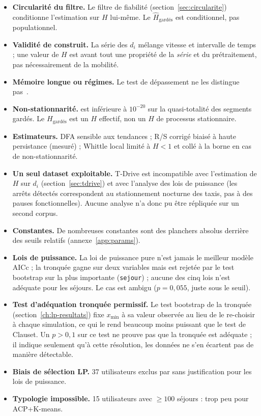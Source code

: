 \documentclass[12pt,a4paper]{report}
\theoremstyle{definition}
\DeclareRobustCommand{\code}[1]{\texorpdfstring{\texttt{\detokenize{#1}}}{\detokenize{#1}}}
\begin{document}
\begin{itemize}
  \item \textbf{Circularité du filtre.} Le filtre de fiabilité (section~\ref{sec:circularite})
  conditionne l'estimation sur $H$ lui-même. Le $\hat H_{\text{gardés}}$ est conditionnel,
  pas populationnel.
  \item \textbf{Validité de construit.} La série des $d_i$ mélange vitesse et intervalle de
  temps ; une valeur de $H$ est avant tout une propriété de la \emph{série} et du
  prétraitement, pas nécessairement de la mobilité.
  \item \textbf{Mémoire longue ou régimes.} Le test de dépassement ne les distingue
  pas~\cite{diebold2001}.
  \item \textbf{Non-stationnarité.} \code{statio_p_value} est inférieure à $10^{-20}$ sur
  la quasi-totalité des segments gardés. Le $H_{\text{gardés}}$ est un $H$ effectif, non
  un $H$ de processus stationnaire.
  \item \textbf{Estimateurs.} DFA sensible aux tendances ; R/S corrigé biaisé à haute
  persistance (mesuré) ; Whittle local limité à $H<1$ et collé à la borne en cas de
  non-stationnarité.
  \item \textbf{Un seul dataset exploitable.} T-Drive est incompatible avec l'estimation
  de $H$ sur $d_i$ (section~\ref{sec:tdrive}) et avec l'analyse des lois de puissance
  (les arrêts détectés correspondent au stationnement nocturne des taxis, pas à des
  pauses fonctionnelles). Aucune analyse n'a donc pu être répliquée sur un second corpus.
  \item \textbf{Constantes.} De nombreuses constantes sont des planchers absolus derrière
  des seuils relatifs (annexe~\ref{app:params}).
  \item \textbf{Lois de puissance.} La loi de puissance pure n'est jamais le meilleur
  modèle AICc ; la tronquée gagne sur deux variables mais est rejetée par le test
  bootstrap sur la plus importante (\texttt{sejour}) ; aucune des cinq lois n'est adéquate
  pour les séjours. Le cas \code{distance} est ambigu ($p=0{,}055$, juste sous le seuil).
  \item \textbf{Test d'adéquation tronquée permissif.} Le test bootstrap de la tronquée
  (section~\ref{ch:lp-resultats}) fixe $x_{\min}$ à sa valeur observée au lieu de le
  re-choisir à chaque simulation, ce qui le rend beaucoup moins puissant que le test de
  Clauset. Un $p > 0{,}1$ sur ce test ne prouve pas que la tronquée est adéquate ; il
  indique seulement qu'à cette résolution, les données ne s'en écartent pas de manière
  détectable.
  \item \textbf{Biais de sélection LP.} 37 utilisateurs exclus par \code{MIN_POINTS=300}
  sans justification pour les lois de puissance.
  \item \textbf{Typologie impossible.} 15 utilisateurs avec $\ge 100$ séjours : trop peu
  pour ACP+K-means.
\end{itemize}
\end{document}
